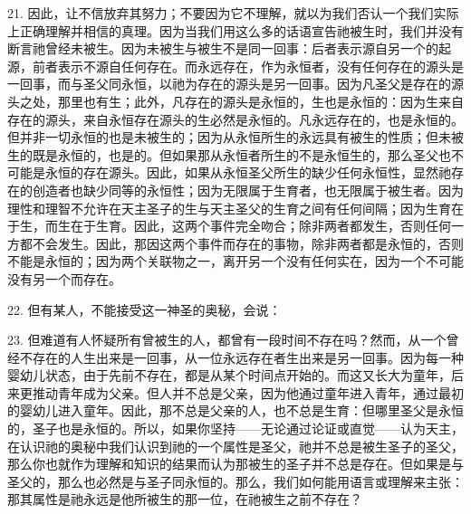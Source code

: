 21. 因此，让不信放弃其努力；不要因为它不理解，就以为我们否认一个我们实际上正确理解并相信的真理。因为当我们用这么多的话语宣告祂被生时，我们并没有断言祂曾经未被生。因为未被生与被生不是同一回事：后者表示源自另一个的起源，前者表示不源自任何存在。而永远存在，作为永恒者，没有任何存在的源头是一回事，而与圣父同永恒，以祂为存在的源头是另一回事。因为凡圣父是存在的源头之处，那里也有生；此外，凡存在的源头是永恒的，生也是永恒的：因为生来自存在的源头，来自永恒存在源头的生必然是永恒的。凡永远存在的，也是永恒的。但并非一切永恒的也是未被生的；因为从永恒所生的永远具有被生的性质；但未被生的既是永恒的，也是的。但如果那从永恒者所生的不是永恒生的，那么圣父也不可能是永恒的存在源头。因此，如果从永恒圣父所生的缺少任何永恒性，显然祂存在的创造者也缺少同等的永恒性；因为无限属于生育者，也无限属于被生者。因为理性和理智不允许在天主圣子的生与天主圣父的生育之间有任何间隔；因为生育在于生，而生在于生育。因此，这两个事件完全吻合；除非两者都发生，否则任何一方都不会发生。因此，那因这两个事件而存在的事物，除非两者都是永恒的，否则不能是永恒的；因为两个关联物之一，离开另一个没有任何实在，因为一个不可能没有另一个而存在。\par

22. 但有某人，不能接受这一神圣的奥秘，会说：\par

23. 但难道有人怀疑所有曾被生的人，都曾有一段时间不存在吗？然而，从一个曾经不存在的人生出来是一回事，从一位永远存在者生出来是另一回事。因为每一种婴幼儿状态，由于先前不存在，都是从某个时间点开始的。而这又长大为童年，后来更推动青年成为父亲。但人并不总是父亲，因为他通过童年进入青年，通过最初的婴幼儿进入童年。因此，那不总是父亲的人，也不总是生育：但哪里圣父是永恒的，圣子也是永恒的。所以，如果你坚持——无论通过论证或直觉——认为天主，在认识祂的奥秘中我们认识到祂的一个属性是圣父，祂并不总是被生圣子的圣父，那么你也就作为理解和知识的结果而认为那被生的圣子并不总是存在。但如果是与圣父的，那么也必然是与圣子同永恒的。那么，我们如何能用语言或理解来主张：那其属性是祂永远是他所被生的那一位，在祂被生之前不存在？\par

